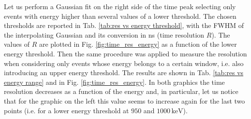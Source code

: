 \documentclass[a4paper]{article}
\begin{document}
Let us perform a Gaussian fit on the right side of the time peak selecting only events with energy higher than several values of a lower threshold. 
The chosen thresholds are reported in Tab. \ref{tab:res vs energy threshold}, with the FWHM of the interpolating Gaussian and its conversion in ns (time resolution $R$). 
The values of $R$ are plotted in Fig. \ref{fig:time_res_energy} as a function of the lower energy threshold.
Then the same procedure was applied to measure the resolution when considering only events whose energy belongs to a certain window, i.e. also introducing an upper energy threshold. 
The results are shown in Tab. \ref{tab:res vs energy range} and in Fig. \ref{fig:time_res_energy}. In both graphics the time resolution decreases as a function of the energy and, in particular, let us notice that for the graphic on the left this value seems to increase again for the last two points (i.e. for a lower energy threshold at $950$ and $1000\, \mathrm{keV}$).
\end{document}
